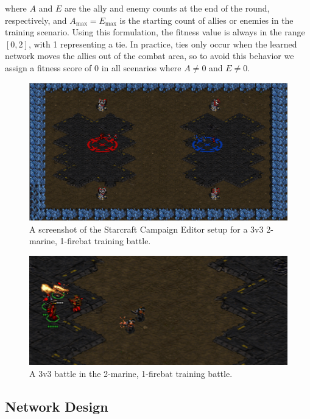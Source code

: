 \documentclass[10pt,a4paper,twocolumn]{article}
\begin{document}
where $A$ and $E$ are the ally and enemy counts at the end of the round, respectively, and $A_\mathrm{max} = E_\mathrm{max}$ is the starting count of allies or enemies in the training scenario. Using this formulation, the fitness value is always in the range $[0,2]$, with 1 representing a tie. In practice, ties only occur when the learned network moves the allies out of the combat area, so to avoid this behavior we assign a fitness score of 0 in all scenarios where $A \neq 0$ and $E \neq 0$.

\begin{figure}
\includegraphics[scale=.28]{figures/mf_setup.png}
\caption{A screenshot of the Starcraft Campaign Editor setup for a 3v3 2-marine, 1-firebat training battle.}
\end{figure}


\begin{figure}
\includegraphics[scale=.34]{figures/mf_battle_small.png}
\caption{A 3v3 battle in the 2-marine, 1-firebat training battle.}
\label{fig:training_setup}
\end{figure}

\subsection{Network Design}
\label{sec:net_design}
\end{document}
